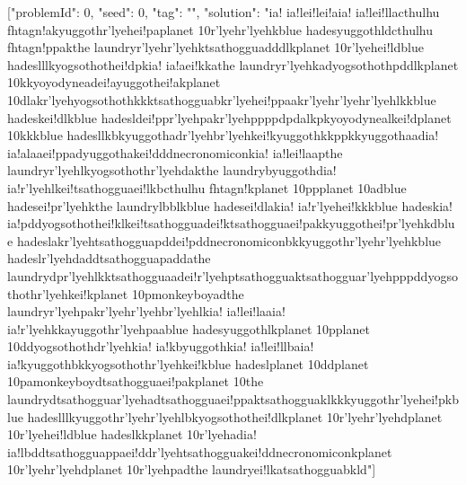 [{"problemId": 0, "seed": 0, "tag": "", "solution": "ia! ia!lei!lei!aia! ia!lei!llacthulhu fhtagn!akyuggothr'lyehei!paplanet 10r'lyehr'lyehkblue hadesyuggothldcthulhu fhtagn!ppakthe laundryr'lyehr'lyehktsathogguadddlkplanet 10r'lyehei!ldblue hadeslllkyogsothothei!dpkia! ia!aei!kkathe laundryr'lyehkadyogsothothpddlkplanet 10kkyoyodyneadei!ayuggothei!akplanet 10dlakr'lyehyogsothothkkktsathogguabkr'lyehei!ppaakr'lyehr'lyehr'lyehlkkblue hadeskei!dlkblue hadesldei!ppr'lyehpakr'lyehppppdpdalkpkyoyodynealkei!dplanet 10kkkblue hadesllkbkyuggothadr'lyehbr'lyehkei!kyuggothkkppkkyuggothaadia! ia!alaaei!ppadyuggothakei!dddnecronomiconkia! ia!lei!laapthe laundryr'lyehlkyogsothothr'lyehdakthe laundrybyuggothdia! ia!r'lyehlkei!tsathogguaei!lkbcthulhu fhtagn!kplanet 10ppplanet 10adblue hadesei!pr'lyehkthe laundrylbblkblue hadesei!dlakia! ia!r'lyehei!kkkblue hadeskia! ia!pddyogsothothei!klkei!tsathogguadei!ktsathogguaei!pakkyuggothei!pr'lyehkdblue hadeslakr'lyehtsathogguapddei!pddnecronomiconbkkyuggothr'lyehr'lyehkblue hadeslr'lyehdaddtsathogguapaddathe laundrydpr'lyehlkktsathogguaadei!r'lyehptsathogguaktsathogguar'lyehpppddyogsothothr'lyehkei!kplanet 10pmonkeyboyadthe laundryr'lyehpakr'lyehr'lyehbr'lyehlkia! ia!lei!laaia! ia!r'lyehkkayuggothr'lyehpaablue hadesyuggothlkplanet 10pplanet 10ddyogsothothdr'lyehkia! ia!kbyuggothkia! ia!lei!llbaia! ia!kyuggothbkkyogsothothr'lyehkei!kblue hadeslplanet 10ddplanet 10pamonkeyboydtsathogguaei!pakplanet 10the laundrydtsathogguar'lyehadtsathogguaei!ppaktsathogguaklkkkyuggothr'lyehei!pkblue hadeslllkyuggothr'lyehr'lyehlbkyogsothothei!dlkplanet 10r'lyehr'lyehdplanet 10r'lyehei!ldblue hadeslkkplanet 10r'lyehadia! ia!lbddtsathogguappaei!ddr'lyehtsathogguakei!ddnecronomiconkplanet 10r'lyehr'lyehdplanet 10r'lyehpadthe laundryei!lkatsathogguabkld"}]
